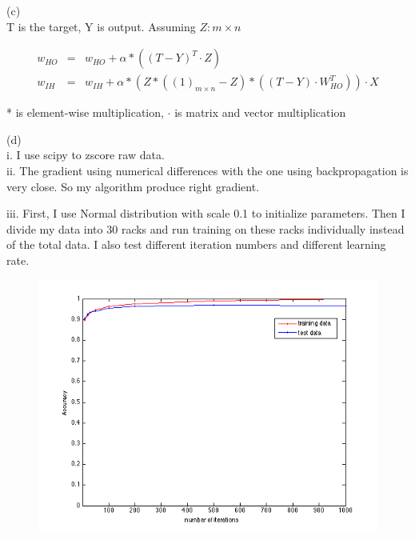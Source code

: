 \documentclass{article} %
\begin{document}
(c) \\
T is the target, Y is output. Assuming $Z : m \times n$

\begin{equation}
    \begin{array}{rcl}
      	 w_{HO} & = & w_{HO} + \alpha * ( (T - Y)^T \cdot Z) \\
	 w_{IH} & = & w_{IH} + \alpha * (  Z * ( (1)_{m \times n} - Z)   * (   (T - Y) \cdot W_{HO}^T )     ) \cdot X
    \end{array}
\end{equation}

* is element-wise multiplication, $\cdot$ is matrix and vector multiplication

(d) \\ i.
I use scipy to zscore raw data. \\

ii. The gradient using numerical differences with the one using backpropagation is very close. So my algorithm produce right gradient.

iii. First, I use Normal distribution with scale 0.1 to initialize parameters. Then I divide my data into 30 racks and run training on these racks individually instead of the total data. I also test different iteration numbers and different learning rate.

\begin{figure}[htbp] %
   \centering
   \includegraphics[width=5in]{img/p4.png} 
\end{figure}

\pagebreak
\end{document}
